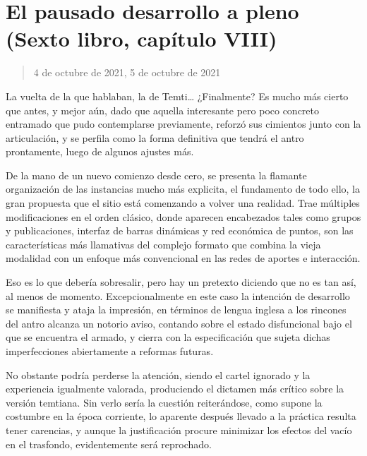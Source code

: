 \documentclass[
]{book}
\begin{document}
\hypertarget{el-pausado-desarrollo-a-pleno-sexto-libro-capuxedtulo-viii}{%
\section{El pausado desarrollo a pleno (Sexto libro, capítulo VIII)}\label{el-pausado-desarrollo-a-pleno-sexto-libro-capuxedtulo-viii}}

\begin{quote}
4 de octubre de 2021, 5 de octubre de 2021
\end{quote}

La vuelta de la que hablaban, la de Temti\ldots{} ¿Finalmente? Es mucho más cierto que antes, y mejor aún, dado que aquella interesante pero poco concreto entramado que pudo contemplarse previamente, reforzó sus cimientos junto con la articulación, y se perfila como la forma definitiva que tendrá el antro prontamente, luego de algunos ajustes más.

De la mano de un nuevo comienzo desde cero, se presenta la flamante organización de las instancias mucho más explicita, el fundamento de todo ello, la gran propuesta que el sitio está comenzando a volver una realidad. Trae múltiples modificaciones en el orden clásico, donde aparecen encabezados tales como grupos y publicaciones, interfaz de barras dinámicas y red económica de puntos, son las características más llamativas del complejo formato que combina la vieja modalidad con un enfoque más convencional en las redes de aportes e interacción.

Eso es lo que debería sobresalir, pero hay un pretexto diciendo que no es tan así, al menos de momento. Excepcionalmente en este caso la intención de desarrollo se manifiesta y ataja la impresión, en términos de lengua inglesa a los rincones del antro alcanza un notorio aviso, contando sobre el estado disfuncional bajo el que se encuentra el armado, y cierra con la especificación que sujeta dichas imperfecciones abiertamente a reformas futuras.

No obstante podría perderse la atención, siendo el cartel ignorado y la experiencia igualmente valorada, produciendo el dictamen más crítico sobre la versión temtiana. Sin verlo sería la cuestión reiterándose, como supone la costumbre en la época corriente, lo aparente después llevado a la práctica resulta tener carencias, y aunque la justificación procure minimizar los efectos del vacío en el trasfondo, evidentemente será reprochado.
\end{document}
